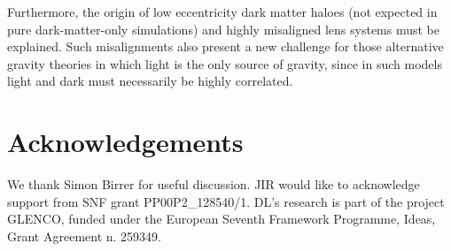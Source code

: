 \documentclass[useAMS,usenatbib]{mn2e}
\begin{document}
Furthermore, the origin of low eccentricity dark matter haloes (not expected in pure dark-matter-only simulations) and highly misaligned lens systems must be explained. Such misalignments also present a new challenge for those alternative gravity theories in which light is the only source of gravity, since in such models light and dark must necessarily be highly correlated.


\section{Acknowledgements}\label{sec:acknowledgements}
We thank Simon Birrer for useful discussion. JIR would like to acknowledge support from SNF grant PP00P2\_128540/1. DL's research is part of the project GLENCO, funded under the European Seventh Framework Programme, Ideas, Grant Agreement n. 259349.





\appendix
\end{document}
